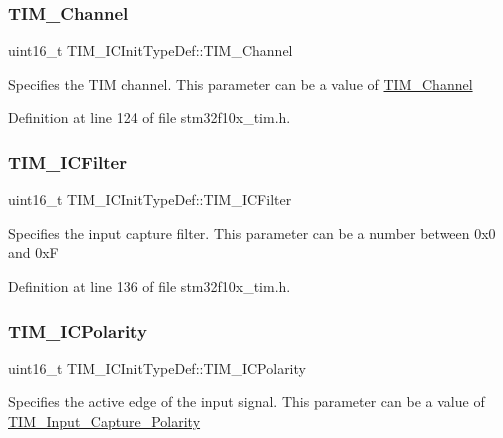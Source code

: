 \subsubsection{\texorpdfstring{T\+I\+M\+\_\+\+Channel}{TIM\_Channel}}
{\footnotesize\ttfamily uint16\+\_\+t T\+I\+M\+\_\+\+I\+C\+Init\+Type\+Def\+::\+T\+I\+M\+\_\+\+Channel}

Specifies the T\+IM channel. This parameter can be a value of \hyperlink{group___t_i_m___channel}{T\+I\+M\+\_\+\+Channel} 

Definition at line 124 of file stm32f10x\+\_\+tim.\+h.

\mbox{\label{struct_t_i_m___i_c_init_type_def_a72539caa6e965e4fa89e3b21b188cf26}} 
\subsubsection{\texorpdfstring{T\+I\+M\+\_\+\+I\+C\+Filter}{TIM\_ICFilter}}
{\footnotesize\ttfamily uint16\+\_\+t T\+I\+M\+\_\+\+I\+C\+Init\+Type\+Def\+::\+T\+I\+M\+\_\+\+I\+C\+Filter}

Specifies the input capture filter. This parameter can be a number between 0x0 and 0xF 

Definition at line 136 of file stm32f10x\+\_\+tim.\+h.

\mbox{\label{struct_t_i_m___i_c_init_type_def_a234c284efc36c0cc15a2ed0fb4435557}} 
\subsubsection{\texorpdfstring{T\+I\+M\+\_\+\+I\+C\+Polarity}{TIM\_ICPolarity}}
{\footnotesize\ttfamily uint16\+\_\+t T\+I\+M\+\_\+\+I\+C\+Init\+Type\+Def\+::\+T\+I\+M\+\_\+\+I\+C\+Polarity}

Specifies the active edge of the input signal. This parameter can be a value of \hyperlink{group___t_i_m___input___capture___polarity}{T\+I\+M\+\_\+\+Input\+\_\+\+Capture\+\_\+\+Polarity} 

